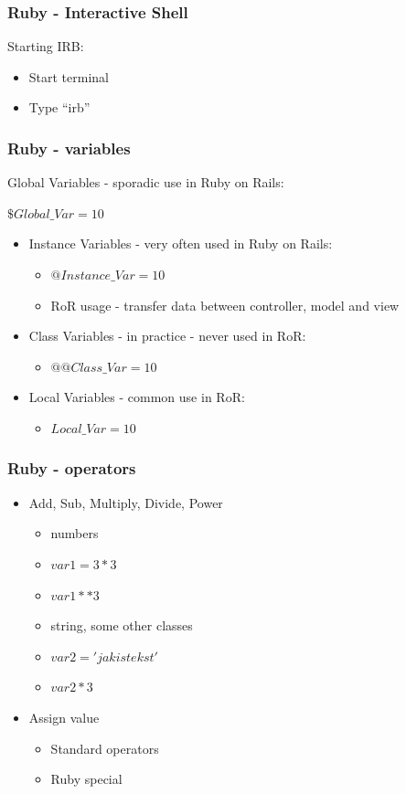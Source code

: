 \documentclass{beamer}
\theoremstyle{mystyle}
\begin{document}
\begin{frame}
  \frametitle{Ruby - Interactive Shell }
  Starting IRB:
  \begin{itemize}
    \item Start terminal
    \item Type ``irb''
  \end{itemize}
\end{frame}

\begin{frame}
  \frametitle{Ruby - variables}
    \begin{definition}
      Global Variables - sporadic use in Ruby on Rails:
    \end{definition}
    \begin{example}
      $ \$Global\_Var=10$
    \end{example}
  \begin{itemize}
    \item Instance Variables - very often used in Ruby on Rails:
      \begin{itemize}
        \item $ @Instance\_Var=10$
        \item RoR usage - transfer data between controller, model and view
      \end{itemize}
    \item Class Variables - in practice - never used in RoR:
      \begin{itemize}
        \item $ @@Class\_Var=10$
      \end{itemize}
    \item Local Variables - common use in RoR:
      \begin{itemize}
        \item $ Local\_Var=10$
      \end{itemize}
    \end{itemize}
  
\end{frame}

\begin{frame}
  \frametitle{Ruby - operators}
  \begin{itemize}
    \item Add, Sub, Multiply, Divide, Power
      \begin{itemize}
        \item numbers
        \item $var1=3*3$
        \item $var1**3$
        \item string, some other classes
        \item $var2 = 'jakis tekst '$
        \item $var2 * 3$
      \end{itemize}
    \item Assign value
      \begin{itemize}
        \item Standard operators
        \item Ruby special
      \end{itemize}
  \end{itemize}
  
\end{frame}
\end{document}
